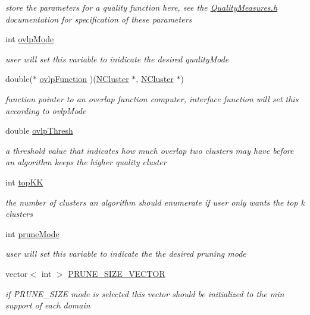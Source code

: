 \begin{DoxyCompactItemize}
\begin{DoxyCompactList}\small\item\em store the parameters for a quality function here, see the \hyperlink{_quality_measures_8h}{QualityMeasures.h} documentation for specification of these parameters \item\end{DoxyCompactList}\item 
int \hyperlink{class_lattice_algos_a7a9a7568a564e929c494c7c94ed5dda5}{ovlpMode}
\begin{DoxyCompactList}\small\item\em user will set this variable to inidicate the desired qualityMode \item\end{DoxyCompactList}\item 
double($\ast$ \hyperlink{class_lattice_algos_ad2bd9f8cb22cb27dfe527dd2bc38ec2d}{ovlpFunction} )(\hyperlink{class_n_cluster}{NCluster} $\ast$, \hyperlink{class_n_cluster}{NCluster} $\ast$)
\begin{DoxyCompactList}\small\item\em function pointer to an overlap function computer, interface function will set this according to ovlpMode \item\end{DoxyCompactList}\item 
double \hyperlink{class_lattice_algos_ae50e2eab1478e1bced92b0f1f1bcdc09}{ovlpThresh}
\begin{DoxyCompactList}\small\item\em a threshold value that indicates how much overlap two clusters may have before an algorithm keeps the higher quality cluster \item\end{DoxyCompactList}\item 
int \hyperlink{class_lattice_algos_a90e06533d513efc4635905624283eeae}{topKK}
\begin{DoxyCompactList}\small\item\em the number of clusters an algorithm should enumerate if user only wants the top k clusters \item\end{DoxyCompactList}\item 
int \hyperlink{class_lattice_algos_a5a4badfea96f02f89d8943ca7fecc2ab}{pruneMode}
\begin{DoxyCompactList}\small\item\em user will set this variable to indicate the the desired pruning mode \item\end{DoxyCompactList}\item 
vector$<$ int $>$ \hyperlink{class_lattice_algos_a244d9a63307846c2df232091a78a6759}{PRUNE\_\-SIZE\_\-VECTOR}
\begin{DoxyCompactList}\small\item\em if PRUNE\_\-SIZE mode is selected this vector should be initialized to the min support of each domain \item\end{DoxyCompactList}\end{DoxyCompactItemize}

